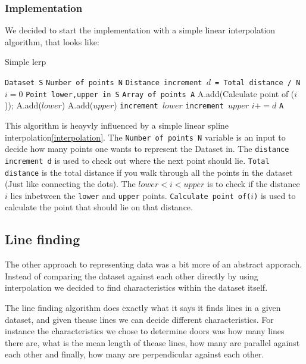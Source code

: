 \documentclass[a4paper, 10pt, conference]{ieeeconf}      %
\begin{document}
\subsubsection{Implementation}
We decided to start the implementation with a simple linear interpolation algorithm, that looks like:

\begin{algorithm}
  \caption{Simple lerp}\label{lerp}
  \begin{algorithmic}[1]
      \State \texttt{Dataset S}
      \State \texttt{Number of points N}
      \State \texttt{Distance increment $d$ = Total distance / N}
      \State \texttt{$i = 0$}
      \State \texttt{Point lower,upper in S}
      \State \texttt{Array of points A}
      		\State A.add(Calculate point of ($i$));
      		\State A.add($lower$)
      		\State A.add($upper$)
      	\Else
      			\State \texttt{increment $lower$}
      			\State \texttt{increment $upper$}
      		\EndWhile
      	\EndIf
      	\State \texttt{$i += d$}
      \EndWhile
      \Return \texttt{A}
  \end{algorithmic}
\end{algorithm}

This algorithm is heayvly influenced by a simple linear spline interpolation\ref{interpolation}. The \texttt{Number of points N} variable is an input to decide how many points one wants to represent the Dataset in. The \texttt{distance increment d} is used to check out where the next point should lie. \texttt{Total distance} is the total distance if you walk through all the points in the dataset (Just like connecting the dots). The \texttt{$lower < i < upper$} is to check if the distance $i$ lies inbetween the \texttt{lower} and \texttt{upper} points. \texttt{Calculate point of($i$)} is used to calculate the point that should lie on that distance.

\subsection{Line finding}
The other approach to representing data was a bit more of an abstract apporach. Instead of comparing the dataset against each other directly by using interpolation we decided to find characteristics within the dataset itself. 

The line finding algorithm does exactly what it says it finds lines in a given dataset, and given thease lines we can decide different characteristics. For instance the characteristics we chose to determine doors was how many lines there are, what is the mean length of thease lines, how many are parallel against each other and finally, how many are perpendicular against each other.
\end{document}

